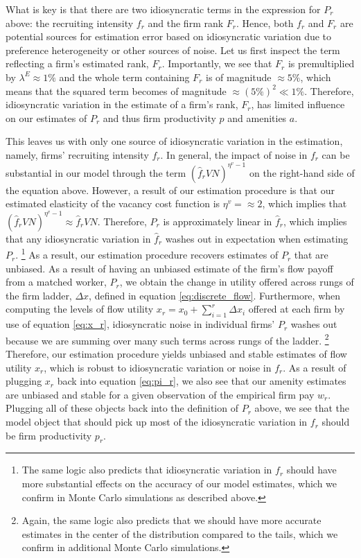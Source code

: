 What is key is that there are two idiosyncratic terms in the expression for $P_{r}$ above: the recruiting intensity $f_{r}$ and the firm rank $F_{r}$. Hence, both $f_{r}$ and $F_{r}$ are potential sources for estimation error based on idiosyncratic variation due to preference heterogeneity or other sources of noise. Let us first inspect the term reflecting a firm's estimated rank, $F_{r}$. Importantly, we see that $F_{r}$ is premultiplied by $\lambda^{E} \approx 1\%$ and the whole term containing $F_{r}$ is of magnitude $\approx 5\%$, which means that the squared term becomes of magnitude $\approx (5\%)^{2} \ll 1\%$. Therefore, idiosyncratic variation in the estimate of a firm's rank, $F_{r}$, has limited influence on our estimates of $P_{r}$ and thus firm productivity $p$ and amenities $a$.

This leaves us with only one source of idiosyncratic variation in the estimation, namely, firms' recruiting intensity $f_{r}$. In general, the impact of noise in $f_{r}$ can be substantial in our model through the term $(\hat{f}_{r} V N)^{\eta^{v} - 1}$ on the right-hand side of the equation above. However, a result of our estimation procedure is that our estimated elasticity of the vacancy cost function is $\eta^{v} = \approx 2$, which implies that $(\hat{f}_{r} V N)^{\eta^{v} - 1} \approx \hat{f}_{r} V N$. Therefore, $P_{r}$ is approximately linear in $\hat{f}_{r}$, which implies that any idiosyncratic variation in $\hat{f}_{r}$ washes out in expectation when estimating $P_{r}$.%
%
\footnote{The same logic also predicts that idiosyncratic variation in $f_{r}$ should have more substantial effects on the accuracy of our model estimates, which we confirm in Monte Carlo simulations as described above.} %
%
As a result, our estimation procedure recovers estimates of $P_{r}$ that are unbiased. As a result of having an unbiased estimate of the firm's flow payoff from a matched worker, $P_{r}$, we obtain the change in utility offered across rungs of the firm ladder, $\Delta x$, defined in equation \eqref{eq:discrete_flow}. Furthermore, when computing the levels of flow utility $x_{r} = x_{0} + \sum_{i=1}^{r} \Delta x_{i}$ offered at each firm by use of equation \eqref{eq:x_r}, idiosyncratic noise in individual firms' $P_{r}$ washes out because we are summing over many such terms across rungs of the ladder.%
%
\footnote{Again, the same logic also predicts that we should have more accurate estimates in the center of the distribution compared to the tails, which we confirm in additional Monte Carlo simulations.} %
%
Therefore, our estimation procedure yields unbiased and stable estimates of flow utility $x_{r}$, which is robust to idiosyncratic variation or noise in $f_{r}$. As a result of plugging $x_{r}$ back into equation \eqref{eq:pi_r}, we also see that our amenity estimates are unbiased and stable for a given observation of the empirical firm pay $w_{r}$. Plugging all of these objects back into the definition of $P_{r}$ above, we see that the model object that should pick up most of the idiosyncratic variation in $f_{r}$ should be firm productivity $p_{r}$.

